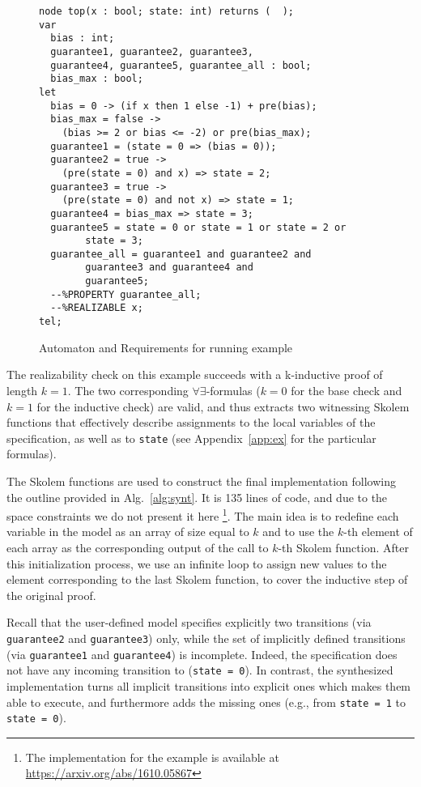 \begin{figure}[tb]
\centering
{}
\begin{minipage}[c][4.5cm]{0.5\textwidth}
 \begin{Verbatim}[fontsize=\tiny]
node top(x : bool; state: int) returns (  );
var
  bias : int;
  guarantee1, guarantee2, guarantee3,
  guarantee4, guarantee5, guarantee_all : bool;
  bias_max : bool;
let
  bias = 0 -> (if x then 1 else -1) + pre(bias);
  bias_max = false ->
	(bias >= 2 or bias <= -2) or pre(bias_max);
  guarantee1 = (state = 0 => (bias = 0));
  guarantee2 = true ->
  	(pre(state = 0) and x) => state = 2;
  guarantee3 = true ->
  	(pre(state = 0) and not x) => state = 1;
  guarantee4 = bias_max => state = 3;
  guarantee5 = state = 0 or state = 1 or state = 2 or 
  		state = 3;
  guarantee_all = guarantee1 and guarantee2 and
  		guarantee3 and guarantee4 and 
  		guarantee5;
  --%PROPERTY guarantee_all;
  --%REALIZABLE x;
tel;
 \end{Verbatim}
\end{minipage}
\caption{Automaton and Requirements for running example}
\label{fg:example}
\end{figure}

The realizability check on this example succeeds with a k-inductive
proof of length $k = 1$. The two corresponding
$\forall\exists$-formulas ($k=0$ for the base check and $k=1$ for the
inductive check) are valid, and thus \aeval extracts two witnessing
Skolem functions that effectively describe assignments to the local
variables of the specification, as well as to \texttt{state} (see
Appendix~\ref{app:ex} for the particular formulas).

The Skolem functions are used to construct the final implementation
following the outline provided in Alg.~\ref{alg:synt}.
It is 135 lines of code, and due to the space constraints we do not
present it here%
\footnote{The implementation for the
example is available at \url{https://arxiv.org/abs/1610.05867}}.
The main idea is to redefine each variable in the model
as an array of size equal to $k$ and
to use the $k$-th element of each array as the corresponding output of the call
to $k$-th Skolem function. After this initialization process, we use an infinite
loop to assign new values to the element corresponding to the last Skolem
function, to cover the inductive step of the original proof.

Recall that the user-defined model specifies explicitly two transitions (via \texttt{guarantee2} and \texttt{guarantee3}) only, while the set of implicitly defined transitions (via \texttt{guarantee1} and \texttt{guarantee4}) is incomplete.
Indeed, the specification does not have any incoming transition to (\texttt{state = 0}).
In contrast, the synthesized implementation turns all implicit transitions into explicit ones which makes them able to execute, and furthermore adds the missing ones (e.g., from \texttt{state = 1} to \texttt{state = 0}).


